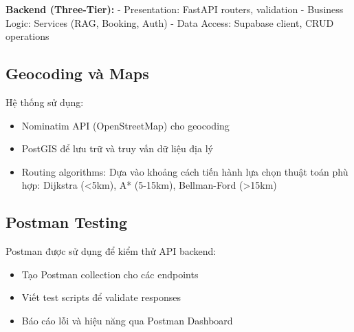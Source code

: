 \textbf{Backend (Three-Tier):}
- Presentation: FastAPI routers, validation
- Business Logic: Services (RAG, Booking, Auth)
- Data Access: Supabase client, CRUD operations

\subsection{Geocoding và Maps}

Hệ thống sử dụng:
\begin{itemize}
    \item Nominatim API (OpenStreetMap) cho geocoding
    \item PostGIS để lưu trữ và truy vấn dữ liệu địa lý
    \item Routing algorithms: Dựa vào khoảng cách tiến hành lựa chọn thuật toán phù hợp: Dijkstra (<5km), A* (5-15km), Bellman-Ford (>15km)
\end{itemize}

\subsection{Postman Testing}
Postman được sử dụng để kiểm thử API backend:
\begin{itemize}
    \item Tạo Postman collection cho các endpoints
    \item Viết test scripts để validate responses
    \item Báo cáo lỗi và hiệu năng qua Postman Dashboard
\end{itemize}
\clearpage
